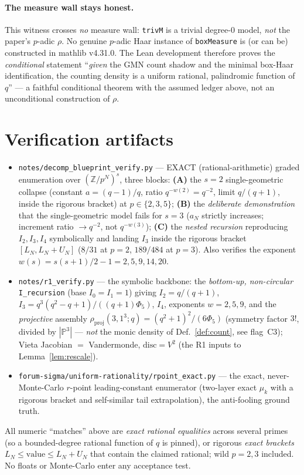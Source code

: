 \documentclass[11pt]{article}
\theoremstyle{definition}
\theoremstyle{remark}
\newcommand{\disc}{\mathrm{disc}}
\begin{document}
\paragraph{The measure wall stays honest.} This witness crosses \emph{no} measure
wall: \texttt{trivM} is a trivial degree-$0$ model, \emph{not} the paper's $p$-adic
$\rho$. No genuine $p$-adic Haar instance of \texttt{boxMeasure} is (or can be)
constructed in mathlib v4.31.0. The Lean development therefore proves the
\emph{conditional} statement ``\emph{given} the GMN count shadow and the minimal
box-Haar identification, the counting density is a uniform rational, palindromic
function of $q$'' --- a faithful conditional theorem with the assumed ledger above,
not an unconditional construction of $\rho$.

\section*{Verification artifacts}
\begin{itemize}[nosep]
\item \texttt{notes/decomp\_blueprint\_verify.py} --- EXACT (rational-arithmetic)
graded enumeration over $(\mathbb Z/p^N)^s$, three blocks: \textbf{(A)} the $s=2$
single-geometric collapse (constant $a=(q-1)/q$, ratio $q^{-w(2)}=q^{-2}$, limit
$q/(q+1)$, inside the rigorous bracket) at $p\in\{2,3,5\}$; \textbf{(B)} the
\emph{deliberate demonstration} that the single-geometric model fails for $s=3$
($a_N$ strictly increases; increment ratio $\to q^{-2}$, not $q^{-w(3)}$);
\textbf{(C)} the \emph{nested recursion} reproducing $I_2,I_3,I_4$ symbolically and
landing $I_3$ inside the rigorous bracket $[L_N,L_N+U_N]$ ($8/31$ at $p=2$,
$189/484$ at $p=3$). Also verifies the exponent $w(s)=s(s+1)/2-1=2,5,9,14,20$.
\item \texttt{notes/r1\_verify.py} --- the symbolic backbone: the \emph{bottom-up,
non-circular} \texttt{I\_recursion} (base $I_0=I_1=1$) giving
$I_2=q/(q+1)$, $I_3=q^3(q^2-q+1)/((q+1)\Phi_5)$, $I_4$, exponents $w=2,5,9$, and the
\emph{projective} assembly $\rho_{\mathrm{proj}}(3,1^3;q)=(q^2+1)^2/(6\Phi_5)$
(symmetry factor $3!$, divided by $|\mathbb P^3|$ --- \emph{not} the monic density of
Def.~\ref{def:count}, see flag~C3); Vieta Jacobian $=$ Vandermonde, $\disc=V^2$ (the
R1 inputs to Lemma~\ref{lem:rescale}).
\item \texttt{forum-sigma/uniform-rationality/rpoint\_exact.py} --- the exact,
never-Monte-Carlo $r$-point leading-constant enumerator (two-layer exact
$\mu_k$ with a rigorous bracket and self-similar tail extrapolation), the
anti-fooling ground truth.
\end{itemize}

All numeric ``matches'' above are \emph{exact rational equalities} across several
primes (so a bounded-degree rational function of $q$ is pinned), or rigorous
\emph{exact brackets} $L_N\le\text{value}\le L_N+U_N$ that contain the claimed
rational; wild $p=2,3$ included. No floats or Monte-Carlo enter any acceptance test.
\end{document}
